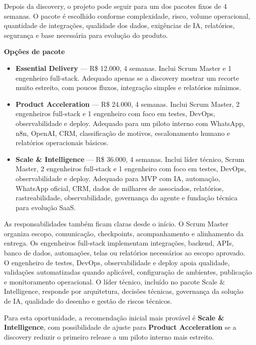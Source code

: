\documentclass[11pt,a4paper]{article}
\begin{document}
Depois da discovery, o projeto pode seguir para um dos pacotes fixos de 4 semanas. O pacote é escolhido conforme complexidade, risco, volume operacional, quantidade de integrações, qualidade dos dados, exigências de IA, relatórios, segurança e base necessária para evolução do produto.\par

\textbf{Opções de pacote}\par

\begin{itemize}
\item \textbf{Essential Delivery} --- R\$ 12.000, 4 semanas. Inclui Scrum Master e 1 engenheiro full-stack. Adequado apenas se a discovery mostrar um recorte muito estreito, com poucos fluxos, integração simples e relatórios mínimos.
\item \textbf{Product Acceleration} --- R\$ 24.000, 4 semanas. Inclui Scrum Master, 2 engenheiros full-stack e 1 engenheiro com foco em testes, DevOps, observabilidade e deploy. Adequado para um piloto interno com WhatsApp, n8n, OpenAI, CRM, classificação de motivos, escalonamento humano e relatórios operacionais básicos.
\item \textbf{Scale \& Intelligence} --- R\$ 36.000, 4 semanas. Inclui líder técnico, Scrum Master, 2 engenheiros full-stack e 1 engenheiro com foco em testes, DevOps, observabilidade e deploy. Adequado para MVP com IA, automação, WhatsApp oficial, CRM, dados de milhares de associados, relatórios, rastreabilidade, observabilidade, governança do agente e fundação técnica para evolução SaaS.
\end{itemize}

As responsabilidades também ficam claras desde o início. O Scrum Master organiza escopo, comunicação, checkpoints, acompanhamento e alinhamento da entrega. Os engenheiros full-stack implementam integrações, backend, APIs, banco de dados, automações, telas ou relatórios necessários ao escopo aprovado. O engenheiro de testes, DevOps, observabilidade e deploy apoia qualidade, validações automatizadas quando aplicável, configuração de ambientes, publicação e monitoramento operacional. O líder técnico, incluído no pacote Scale \& Intelligence, responde por arquitetura, decisões técnicas, governança da solução de IA, qualidade do desenho e gestão de riscos técnicos.\par

Para esta oportunidade, a recomendação inicial mais provável é \textbf{Scale \& Intelligence}, com possibilidade de ajuste para \textbf{Product Acceleration} se a discovery reduzir o primeiro release a um piloto interno mais estreito.\par
\end{document}
